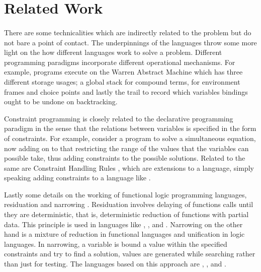 \documentclass[proposal.tex]{subfiles}
\begin{document}
\section{Related Work}\label{sect:relatedWork}

\paragraph{}
 There are some technicalities which are indirectly related to the problem but do not bare a point of contact. The underpinnings of the languages throw some more light on the how different languages work to solve a problem. Different programming paradigms incorporate different operational mechanisms. For example,  programs execute on the Warren Abstract Machine \cite{ait1999warren} which has three different storage usages; a global stack for compound terms, for environment frames and choice points and lastly the trail to record which variables bindings ought to be undone on backtracking.        

\par Constraint programming \cite{website:constraintprogwiki} is closely related to the declarative programming paradigm in the sense that the relations between variables is specified in the form of constraints. For example, consider a program to solve a simultaneous equation, now adding on to that restricting the range of the values that the variables can possible take, thus adding constraints to the possible solutions. Related to the same are Constraint Handling Rules \cite{website:chrwiki}, which are extensions to a language, simply speaking adding constraints to a language like .  

\par Lastly some details on the working of functional logic programming languages, residuation and narrowing \cite{hanus1995curry,webiste:wikicurry}. Residuation involves delaying of functions calls until they are deterministic, that is, deterministic reduction of functions with partial data. This principle is used in languages like  \cite{lloyd1999programming:escher},  \cite{website:life},  
\cite{website:nue-prolog} and  \cite{website:oz-mozart}. Narrowing on the other hand is a mixture of reduction in functional languages and unification in logic languages. In narrowing, a variable is bound a value within the specified constraints and try to find a solution, values are generated while searching rather than just for testing. The languages based on this approach are  \cite{website:alf},  \cite{website:babel},  \cite{bert1987lpg} and  \cite{website:curry}.   
\end{document}
